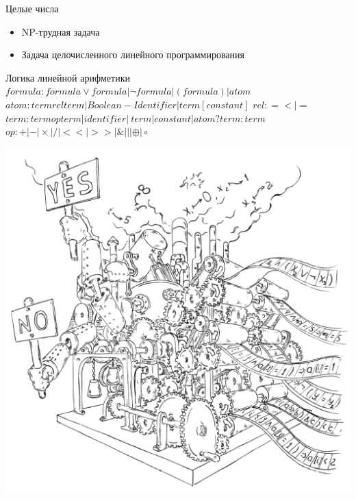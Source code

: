\documentclass{beamer}
\begin{document}
\begin{frame}{Целые числа}
\begin{itemize}
\item NP-трудная задача
\item Задача целочисленного линейного программирования
\end{itemize}
\end{frame}

\begin{frame}{Логика линейной арифметики}
$formula: formula \vee formula | \lnot formula | (formula) | atom$\newline
$atom: term rel term | Boolean-Identifier | term[constant]$\newline
$rel: = < | =$\newline
$term: term op term | identifier | ~term | constant | atom?term:term$\newline
$op: + | - | \times | / | << | >> | \& | | | \oplus | \circ$\newline
\end{frame}

\begin{frame}
\includegraphics[scale=0.5]{../decision-procedure.png}
\end{frame}
\end{document}
